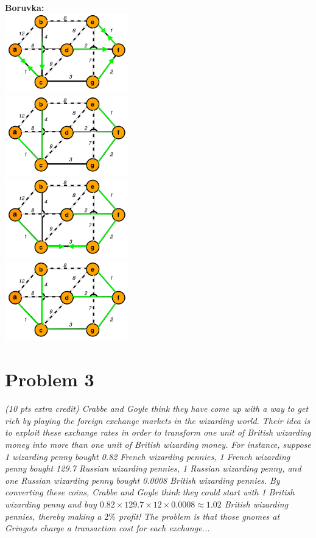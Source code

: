 \documentclass[12pt]{article} \setlength{\oddsidemargin}{0in}
\begin{document}
\begin{enumerate}
    \newpage
    \textbf{Boruvka:}\\
    \includegraphics[width=0.4\textwidth]{P2-boruvka1}\\
    \includegraphics[width=0.4\textwidth]{P2-boruvka2}\\
    \includegraphics[width=0.4\textwidth]{P2-boruvka3}\\
    \includegraphics[width=0.4\textwidth]{P2-boruvka4}
\end{enumerate}
\newpage

\section*{Problem 3}

\textit{(10 pts extra credit) Crabbe and Goyle think they have come up with a way to get
rich by playing the foreign exchange markets in the wizarding world. Their idea is
to exploit these exchange rates in order to transform one unit of British wizarding
money into more than one unit of British wizarding money. For instance, suppose
1 wizarding penny bought 0.82 French wizarding pennies, 1 French wizarding penny
bought 129.7 Russian wizarding pennies, 1 Russian wizarding penny, and one Russian
wizarding penny bought 0.0008 British wizarding pennies. By converting these coins,
Crabbe and Goyle think they could start with 1 British wizarding penny and buy
$0.82 \times 129.7 \times 12 \times 0.0008 \approx 1.02$ British wizarding pennies, thereby making a $2\%$
profit! The problem is that those gnomes at Gringots charge a transaction cost for
each exchange...}
\end{document}
